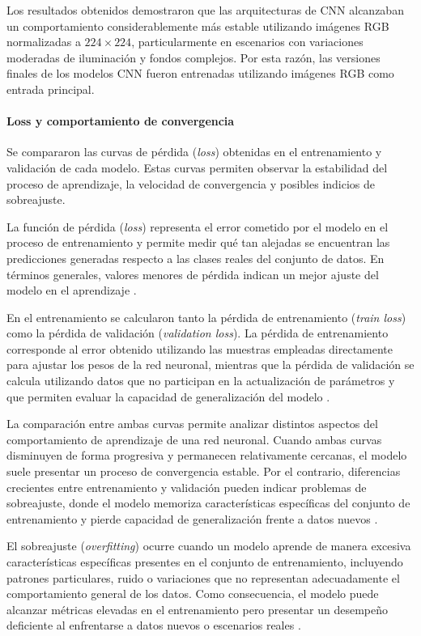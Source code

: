 	Los resultados obtenidos demostraron que las arquitecturas de CNN alcanzaban un comportamiento considerablemente más estable utilizando imágenes RGB normalizadas a $224 \times 224$, particularmente en escenarios con variaciones moderadas de iluminación y fondos complejos. Por esta razón, las versiones finales de los modelos CNN fueron entrenadas utilizando imágenes RGB como entrada principal.
	
	\paragraph{Loss y comportamiento de convergencia}
	
	Se compararon las curvas de pérdida (\textit{loss}) obtenidas en el entrenamiento y validación de cada modelo. Estas curvas permiten observar la estabilidad del proceso de aprendizaje, la velocidad de convergencia y posibles indicios de sobreajuste.
	
	La función de pérdida (\textit{loss}) representa el error cometido por el modelo en el proceso de entrenamiento y permite medir qué tan alejadas se encuentran las predicciones generadas respecto a las clases reales del conjunto de datos. En términos generales, valores menores de pérdida indican un mejor ajuste del modelo en el aprendizaje \cite{goodfellow2016deep,geron2022hands}.
	
	En el entrenamiento se calcularon tanto la pérdida de entrenamiento (\textit{train loss}) como la pérdida de validación (\textit{validation loss}). La pérdida de entrenamiento corresponde al error obtenido utilizando las muestras empleadas directamente para ajustar los pesos de la red neuronal, mientras que la pérdida de validación se calcula utilizando datos que no participan en la actualización de parámetros y que permiten evaluar la capacidad de generalización del modelo \cite{goodfellow2016deep}.
	
	La comparación entre ambas curvas permite analizar distintos aspectos del comportamiento de aprendizaje de una red neuronal. Cuando ambas curvas disminuyen de forma progresiva y permanecen relativamente cercanas, el modelo suele presentar un proceso de convergencia estable. Por el contrario, diferencias crecientes entre entrenamiento y validación pueden indicar problemas de sobreajuste, donde el modelo memoriza características específicas del conjunto de entrenamiento y pierde capacidad de generalización frente a datos nuevos \cite{geron2022hands,chollet2021deep}.
	
	El sobreajuste (\textit{overfitting}) ocurre cuando un modelo aprende de manera excesiva características específicas presentes en el conjunto de entrenamiento, incluyendo patrones particulares, ruido o variaciones que no representan adecuadamente el comportamiento general de los datos. Como consecuencia, el modelo puede alcanzar métricas elevadas en el entrenamiento pero presentar un desempeño deficiente al enfrentarse a datos nuevos o escenarios reales \cite{goodfellow2016deep,chollet2021deep}.
	
